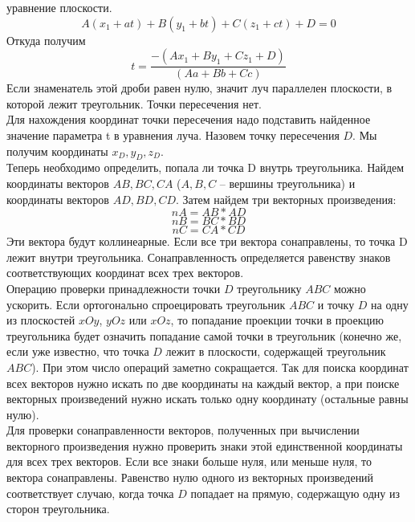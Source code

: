 \documentclass[a4paper, 10pt]{article}
\begin{document}
	уравнение плоскости.
	\begin{equation}
		A(x_1 + at) + B(y_1 + bt) + C(z_1 + ct)  + D = 0
	\end{equation}
	Откуда получим
	\begin{equation}
		t = \frac{-(Ax_1 + By_1 + Cz_1 + D)}{(Aa + Bb + Cc)} 
	\end{equation}
	\hspace*{5mm}Если  знаменатель этой дроби равен нулю, значит луч параллелен плоскости, в которой лежит треугольник. Точки пересечения нет.
	\\ \hspace*{5mm} Для нахождения координат точки пересечения надо подставить найденное значение параметра t в уравнения луча. Назовем точку пересечения $D$. Мы получим координаты $x_D, y_D, z_D$.
	\\ \hspace*{5mm} Теперь необходимо определить, попала ли точка D внутрь треугольника. Найдем координаты векторов $AB, BC, CA$ ($A, B, C$ – вершины треугольника) и координаты векторов $AD, BD, CD$. Затем найдем три векторных произведения:
	\begin{equation}
		nA = AB * AD 
	\end{equation}
	\begin{equation}
		nB = BC * BD 
	\end{equation}
	\begin{equation}
		nC = CA * CD
	\end{equation}
	\hspace*{5mm} Эти вектора будут коллинеарные. Если все три вектора сонаправлены, то точка D лежит внутри треугольника. Сонаправленность определяется равенству знаков соответствующих координат всех трех векторов.
	\\ \hspace*{5mm} Операцию проверки принадлежности точки $D$ треугольнику $ABC$ можно ускорить. Если ортогонально спроецировать треугольник $ABC$ и точку $D$ на одну из плоскостей $xOy$, $yOz$ или $xOz$, то попадание проекции точки в проекцию треугольника будет означить попадание самой точки в треугольник (конечно же, если уже известно, что точка $D$ лежит в плоскости, содержащей треугольник $ABC$). При этом число операций заметно сокращается. Так для поиска координат  всех векторов нужно искать по две координаты на каждый вектор, а при поиске векторных произведений нужно искать только одну координату (остальные равны нулю).
	\\ \hspace*{5mm}Для проверки сонаправленности векторов, полученных при вычислении векторного произведения нужно проверить знаки этой единственной координаты для всех трех векторов. Если все знаки больше нуля, или меньше нуля, то вектора сонаправлены. Равенство нулю одного из векторных произведений соответствует случаю, когда точка $D$ попадает на прямую, содержащую одну из сторон треугольника. 
\end{document}
